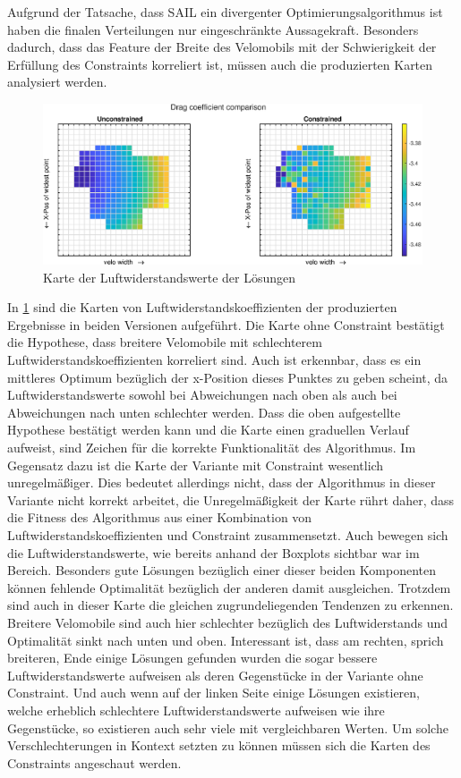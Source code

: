 Aufgrund der Tatsache, dass SAIL ein divergenter Optimierungsalgorithmus ist haben die finalen Verteilungen nur eingeschränkte Aussagekraft.
Besonders dadurch, dass das Feature der Breite des Velomobils mit der Schwierigkeit der Erfüllung des Constraints korreliert ist, müssen auch die produzierten Karten analysiert werden.

\begin{figure}[h]
	\includegraphics[width=1\linewidth]{bilder/2pt500Samples/dragMapComparison}
	\caption{Karte der Luftwiderstandswerte der Lösungen}
	\label{fig:1stmapDrag}
\end{figure}

In \cref{fig:1stmapDrag} sind die Karten von Luftwiderstandskoeffizienten der produzierten Ergebnisse in beiden Versionen aufgeführt.
Die Karte ohne Constraint bestätigt die Hypothese, dass breitere Velomobile mit schlechterem Luftwiderstandskoeffizienten korreliert sind.
Auch ist erkennbar, dass es ein mittleres Optimum bezüglich der x-Position dieses Punktes zu geben scheint, da Luftwiderstandswerte sowohl bei Abweichungen nach oben als auch bei Abweichungen nach unten schlechter werden.
Dass die oben aufgestellte Hypothese bestätigt werden kann und die Karte einen graduellen Verlauf aufweist, sind Zeichen für die korrekte Funktionalität des Algorithmus.
Im Gegensatz dazu ist die Karte der Variante mit Constraint wesentlich unregelmäßiger.
Dies bedeutet allerdings nicht, dass der Algorithmus in dieser Variante nicht korrekt arbeitet, die Unregelmäßigkeit der Karte rührt daher, dass die Fitness des Algorithmus aus einer Kombination von Luftwiderstandskoeffizienten und Constraint zusammensetzt.
Auch bewegen sich die Luftwiderstandswerte, wie bereits anhand der Boxplots sichtbar war im Bereich.
Besonders gute Lösungen bezüglich einer dieser beiden Komponenten können fehlende Optimalität bezüglich der anderen damit ausgleichen.
Trotzdem sind auch in dieser Karte die gleichen zugrundeliegenden Tendenzen zu erkennen.
Breitere Velomobile sind auch hier schlechter bezüglich des Luftwiderstands und Optimalität sinkt nach unten und oben.
Interessant ist, dass am rechten, sprich breiteren, Ende einige Lösungen gefunden wurden die sogar bessere Luftwiderstandswerte aufweisen als deren Gegenstücke in der Variante ohne Constraint.
Und auch wenn auf der linken Seite einige Lösungen existieren, welche erheblich schlechtere Luftwiderstandswerte aufweisen wie ihre Gegenstücke, so existieren auch sehr viele mit vergleichbaren Werten.
Um solche Verschlechterungen in Kontext setzten zu können müssen sich die Karten des Constraints angeschaut werden.

